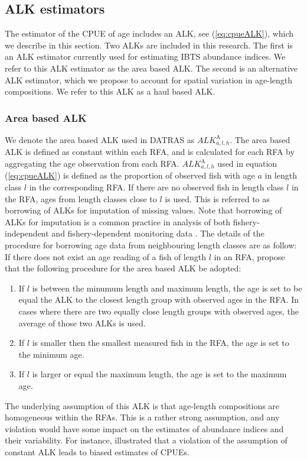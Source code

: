 \documentclass[a4paper 12pt]{article}
\numberwithin{equation}{section}
\begin{document}
\subsection{ALK estimators}
\label{sec:alkmethods}
The estimator of the CPUE of age includes an ALK, see (\ref{eq:cpueALK}), which we describe in this section. Two ALKs are included in this research. The first is an ALK estimator currently used for estimating IBTS abundance indices. We refer to this ALK estimator as the area based ALK. The second is an alternative ALK estimator, which we propose to account for spatial variation in age-length compositions. We refer to this ALK as a haul based ALK.

\subsubsection{Area based ALK}
\label{sec:datrasalkestimator}
We denote the area based ALK used in DATRAS as $ALK^{\text{A}}_{a,l,h}$. The area based ALK is defined as constant within each RFA, and is calculated for each RFA by aggregating the age observation from each RFA. $ALK^{\text{A}}_{a,l,h}$ used in equation (\ref{eq:cpueALK}) is defined as the proportion of observed fish with age $a$ in length class $l$ in the corresponding RFA. If there are no observed fish in length class $l$ in the RFA, ages from length classes close to $l$ is used. This is referred to as borrowing of ALKs for imputation of missing values. Note that borrowing of ALKs for imputation is a common practice in analysis of both fishery-independent and fishery-dependent monitoring data \citep[see for example,][]{aanes2015efficient,catchpole2017challenges}. The details of the procedure for borrowing age data from neighbouring length classes are as follow: If there does not exist an age reading of a fish of length $l$ in an RFA,  \citet{ICES2013} propose that the following procedure  for the area based ALK be adopted:
\begin{enumerate}
\item If $l$ is between the minumum length and maximum length, the age is set to be equal the ALK to the closest length group with observed ages in the RFA. In cases where there are two equally close length groups with observed ages, the average of those two ALKs is used. 
\item If $l$ is smaller then the smallest measured fish in the RFA, the age is set to the minimum age.
\item If $l$ is larger or equal the maximum length, the age is set to the maximum age.
\end{enumerate}
The underlying assumption of this ALK  is that age-length compositions are homogeneous within the RFAs. This is a rather strong assumption, and any violation would have some impact on the estimates of abundance indices and their variability. For instance,  \citet{aanes2015efficient} illustrated that a violation of the assumption of constant ALK leads to biased estimates of CPUEs. 
\end{document}
